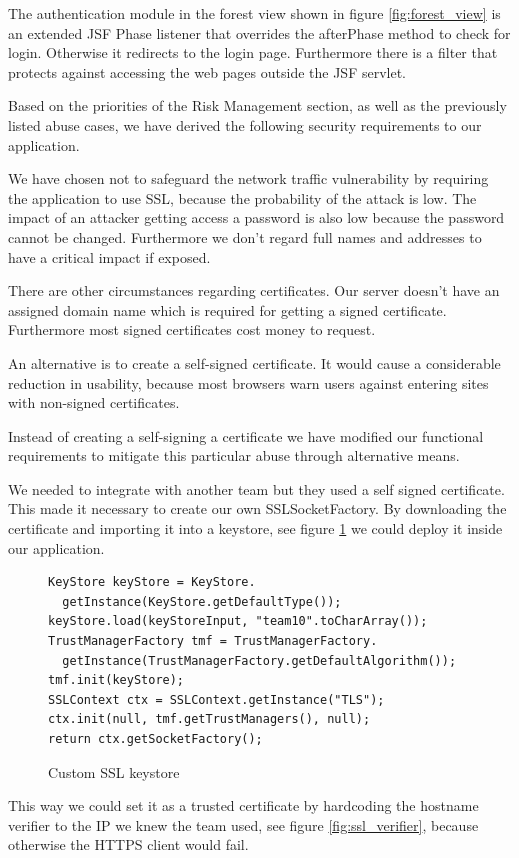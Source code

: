 \documentclass[a4paper]{article}
\begin{document}
The authentication module in the forest view shown in figure \ref{fig:forest_view} is an extended JSF Phase listener that overrides the afterPhase method to check for login. Otherwise it redirects to the login page.
Furthermore there is a filter that protects against accessing the web pages outside the JSF servlet.  
  

Based on the priorities of the Risk Management section, as well as the previously listed abuse cases, we have derived the following security requirements to our application.



We have chosen not to safeguard the network traffic vulnerability by requiring the application to use SSL, because the probability of the attack is low. The impact of an attacker getting access a password is also low because the password cannot be changed. Furthermore we don't regard full names and addresses to have a critical impact if exposed.


There are other circumstances regarding certificates. Our server doesn't have an assigned domain name which is required for getting a signed certificate. Furthermore most signed certificates cost money to request.

An alternative is to create a self-signed certificate. It would cause a considerable reduction in usability, because most browsers warn users against entering sites with non-signed certificates. 

Instead of creating a self-signing a certificate we have modified our functional requirements to mitigate this particular abuse through alternative means.

We needed to integrate with another team but they used a self signed certificate. This made it necessary to create our own SSLSocketFactory. By downloading the certificate and importing it into a keystore, see figure \ref{fig:ssl_keystore} we could deploy it inside our application. 
\begin{figure}[h!]
\caption{Custom SSL keystore}
\label{fig:ssl_keystore}   
\begin{lstlisting}
KeyStore keyStore = KeyStore.
  getInstance(KeyStore.getDefaultType());
keyStore.load(keyStoreInput, "team10".toCharArray());
TrustManagerFactory tmf = TrustManagerFactory.
  getInstance(TrustManagerFactory.getDefaultAlgorithm());
tmf.init(keyStore);
SSLContext ctx = SSLContext.getInstance("TLS");
ctx.init(null, tmf.getTrustManagers(), null);
return ctx.getSocketFactory();
\end{lstlisting}
\end{figure}
This way we could set it as a trusted certificate by hardcoding the hostname verifier to the IP we knew the team used, see figure \ref{fig:ssl_verifier}, because otherwise the HTTPS client would fail.
\end{document}
